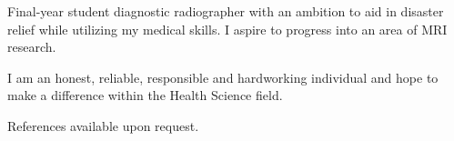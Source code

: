 

\begin{cvparagraph}

Final-year student diagnostic radiographer with an ambition to aid in disaster relief while utilizing my medical skills. I aspire to progress into an area of MRI research.

I am an honest, reliable, responsible and hardworking individual and hope to make a difference within the Health Science field.

References available upon request.

\end{cvparagraph}
